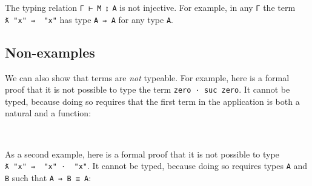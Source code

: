 The typing relation \texttt{Γ\ ⊢\ M\ ⦂\ A} is not injective. For
example, in any \texttt{Γ} the term
\texttt{ƛ\ "x"\ ⇒\ \textasciigrave{}\ "x"} has type \texttt{A\ ⇒\ A} for
any type \texttt{A}.

\hypertarget{non-examples}{%
\subsection{Non-examples}\label{non-examples}}

We can also show that terms are \emph{not} typeable. For example, here
is a formal proof that it is not possible to type the term
\texttt{\textasciigrave{}zero\ ·\ \textasciigrave{}suc\ \textasciigrave{}zero}.
It cannot be typed, because doing so requires that the first term in the
application is both a natural and a function:

\begin{fence}
\begin{code}%
\>[0]\AgdaSpace{}%
\AgdaSymbol{:}\AgdaSpace{}%
\AgdaSpace{}%
\AgdaSymbol{\{}\AgdaSymbol{\}}\AgdaSpace{}%
\AgdaSpace{}%
\AgdaSpace{}%
\AgdaSymbol{(}\AgdaSpace{}%
\AgdaSpace{}%
\AgdaSpace{}%
\AgdaSpace{}%
\AgdaSpace{}%
\AgdaSpace{}%
\AgdaSpace{}%
\AgdaSymbol{)}\<%
\\
\>[0]\AgdaSpace{}%
\AgdaSymbol{(()}\AgdaSpace{}%
\AgdaSpace{}%
\AgdaSymbol{\AgdaUnderscore{})}\<%
\end{code}
\end{fence}

As a second example, here is a formal proof that it is not possible to
type
\texttt{ƛ\ "x"\ ⇒\ \textasciigrave{}\ "x"\ ·\ \textasciigrave{}\ "x"}.
It cannot be typed, because doing so requires types \texttt{A} and
\texttt{B} such that \texttt{A\ ⇒\ B\ ≡\ A}:


